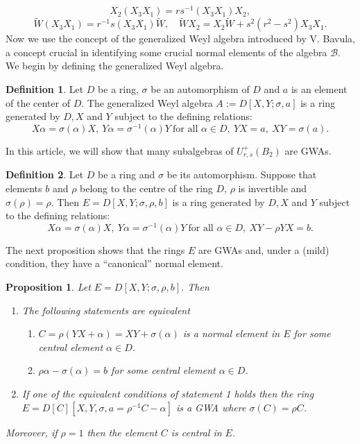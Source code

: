 \documentclass[12 pt,reqno]{amsart}
\numberwithin{equation}{section}
\newcommand{\B}{\mathcal{B}}
\newtheorem{prop}[thm]{Proposition}
\theoremstyle{definition}
\theoremstyle{definition}
\newtheorem{dfn}{Definition}
\theoremstyle{remark}
\theoremstyle{remark}
\begin{document}
\[X_2(X_3X_1)=rs^{-1}(X_3X_1)X_2,\]
\[  \tilde{W}(X_3X_1)=r^{-1}s(X_3X_1)\tilde{W},
\quad \tilde{W}X_2=X_2\tilde{W}+s^2(r^2-s^2)X_3X_1.\]
Now we use the concept of the generalized Weyl algebra introduced by V. Bavula, a concept crucial in identifying some crucial normal elements of the algebra $\B$. We begin by defining the generalized Weyl algebra.
\begin{dfn}\cite{ba3}
    Let $D$ be a ring, $\sigma$ be an automorphism of $D$
and $a$ is an element of the center of $D$. The generalized Weyl algebra $A:=D[X,Y;\sigma,a]$ is a ring generated by $D, X$ and $Y$ subject to the defining relations:
\[X\alpha=\sigma(\alpha)X,~ Y\alpha=\sigma^{-1}(\alpha)Y~\text{for all $\alpha \in D$},~ YX=a,~XY=\sigma(a).\]
\end{dfn}
In this article, we will show that many subalgebras of $U_{r,s}^+(B_2)$ are GWAs.
\begin{dfn}\cite{ba3}
    Let $D$ be a ring and $\sigma$ be its automorphism. Suppose that elements $b$ and $\rho$ belong to the centre of the ring $D$, $\rho$ is invertible and $\sigma(\rho)=\rho$.
Then $E=D[X,Y;\sigma,\rho,b]$ is a ring generated by $D, X$ and $Y$ subject to the defining relations:
\[X\alpha=\sigma(\alpha)X,~ Y\alpha=\sigma^{-1}(\alpha)Y~\text{for all $\alpha \in D$},~XY-\rho YX=b.\]
\end{dfn}
The next proposition shows that the rings $E$ are GWAs and, under a (mild) condition, they have a \enquote{canonical} normal element.
\begin{prop}\label{GWA}\cite[Lemma 1.3, Corollary 1.4, Corollary 1.6]{ba3}
    Let $E=D[X,Y;\sigma,\rho,b]$. Then 
    \begin{enumerate}[label= \((\arabic*)\)]
        \item The following statements are equivalent
        \begin{enumerate}[label=\((\alph*)\)]
            \item ${C}=\rho(YX+\alpha)=XY+\sigma(\alpha)$  is a normal element in $E$ for some central element $\alpha \in D$.
            \item $\rho\alpha-\sigma(\alpha)=b$ for some central element $\alpha \in D$.
        \end{enumerate}
        \item  If one of the equivalent conditions of statement 1 holds then the ring $E=D[C][X, Y,\sigma,a=\rho^{-1}C-\alpha]$  is a GWA where $\sigma(C)=\rho C$. 
    \end{enumerate}
    Moreover, if $\rho=1$ then the element $C$ is central in $E$.
\end{prop}
\end{document}
